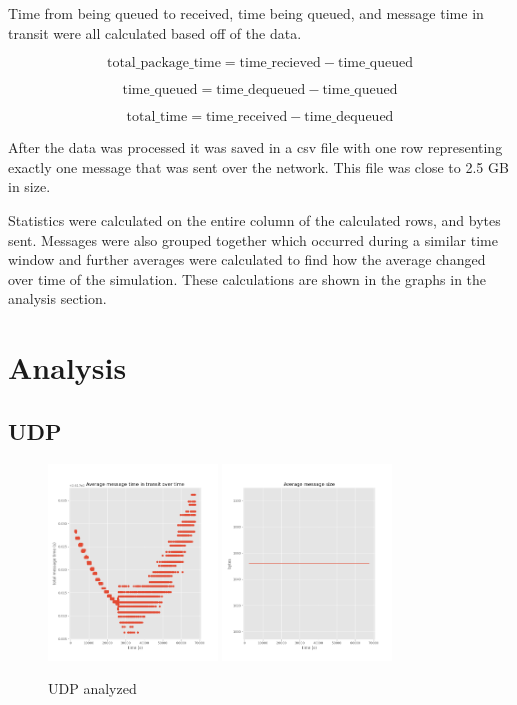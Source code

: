\documentclass[a4paper,12pt]{article}
\begin{document}
Time from being queued to received, time being queued, and message time in transit
were all calculated based off of the data. 

\[\text{total\_package\_time} = \text{time\_recieved} - \text{time\_queued}\]

\[\text{time\_queued} = \text{time\_dequeued} - \text{time\_queued}\]

\[\text{total\_time} = \text{time\_received} - \text{time\_dequeued}\]

After the data was processed it was saved in a csv file with one row representing 
exactly one message that was sent over the network. This file was close to 
2.5 GB in size.

Statistics were calculated on the entire column of the calculated rows, and 
bytes sent. Messages were also grouped together which occurred during a similar 
time window and further averages were calculated to find how the average changed 
over time of the simulation. These calculations are shown in the graphs in the 
analysis section.

\section{Analysis}

\subsection{UDP}

\begin{figure}[h]
  \centering
  \includegraphics[width=0.4\textwidth]{media/udp.png}
  \includegraphics[width=0.4\textwidth]{media/udp_data.png}
  \caption{UDP analyzed}
\end{figure}
\end{document}

